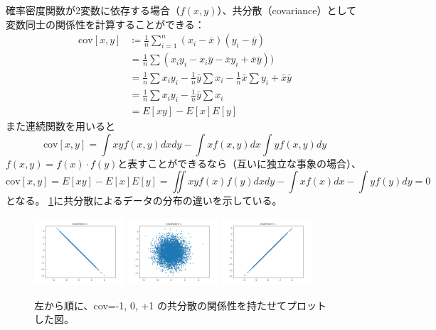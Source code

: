 確率密度関数が2変数に依存する場合（$f(x,y)$）、共分散（covariance）として変数同士の関係性を計算することができる：
\begin{equation}
  \begin{split}
    \mathrm{cov}[x,y]
    & \coloneqq \frac{1}{n} \sum_{i=1}^{n} (x_i-\bar{x})(y_i - \bar{y})  \\
    & = \frac{1}{n} \sum (x_iy_i - x_i\bar{y} - \bar{x}y_i + \bar{x}\bar{y})) \\
    & = \frac{1}{n} \sum x_iy_i - \frac{1}{n}\bar{y} \sum x_i - \frac{1}{n} \bar{x}\sum  y_i + \bar{x}\bar{y} \\
    & = \frac{1}{n} \sum x_iy_i - \frac{1}{n}\bar{y} \sum x_i \\
    & = E[xy] - E[x]E[y]
  \end{split}
\end{equation}
また連続関数を用いると
\begin{equation}
  \mathrm{cov}[x,y] = \int xyf(x,y) dxdy - \int xf(x,y)dx \int yf(x,y)dy
\end{equation}
$f(x,y)=f(x) \cdot f(y)$と表すことができるなら（互いに独立な事象の場合）、
\begin{equation}
  \mathrm{cov}[x,y] = E[xy] - E[x]E[y] = \iint xyf(x)f(y) dxdy - \int xf(x) dx - \int yf(y) dy = 0
\end{equation}
となる。
\ref{fig:fundamental_concepts:covariance}に共分散によるデータの分布の違いを示している。
\begin{figure}
  \centering
  \includegraphics[width=0.3\textwidth]{figure/fundamental_concepts/covariance_-1}
  \includegraphics[width=0.3\textwidth]{figure/fundamental_concepts/covariance_0}
  \includegraphics[width=0.3\textwidth]{figure/fundamental_concepts/covariance_1}
  \caption{
    左から順に、cov=-1, 0, +1 の共分散の関係性を持たせてプロットした図。
  }
  \label{fig:fundamental_concepts:covariance}
\end{figure}

